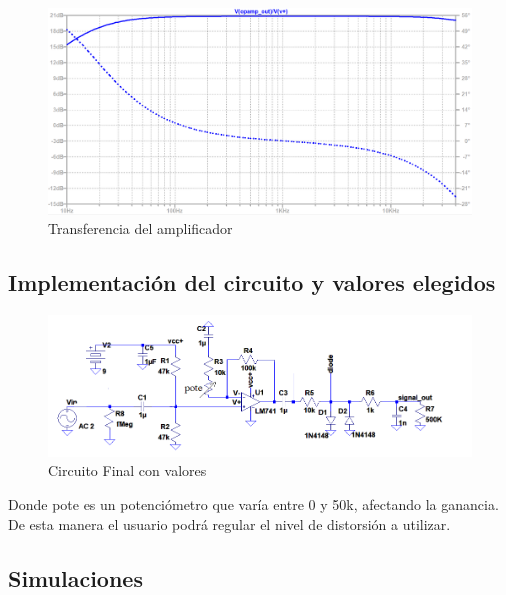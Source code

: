 \documentclass[../../main.tex]{subfiles}
\begin{document}
\begin{figure}[H]
	\centering
	\includegraphics[scale=.4]{imagenes/bode_opamp_simulacion_300mv.png}
	\caption{Transferencia del amplificador}
	\label{fig:ej5_transferencia_opamp}
\end{figure}

\subsection{Implementación del circuito y valores elegidos}
\begin{figure}[H]
	\centering
	\includegraphics[scale=1]{imagenes/circuito_final.png}
	\caption{Circuito Final con valores}
	\label{fig:ej5_circuito_final}
\end{figure}

Donde pote es un potenciómetro que varía entre 0 y 50k, afectando la ganancia. De esta manera el usuario podrá regular el nivel de distorsión a utilizar.

\subsection{Simulaciones}
\end{document}
